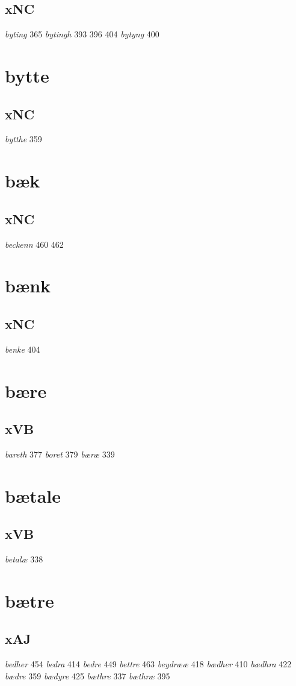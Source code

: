 \documentclass[a4paper,twocolumn]{article}
\begin{document}
\subsection{xNC}
\label{sec:org186402c}
\emph{byting} 365 \emph{bytingh} 393 396 404 \emph{bytyng} 400 
\section{bytte}
\label{sec:org489d211}
\subsection{xNC}
\label{sec:org4679dbe}
\emph{bytthe} 359 
\section{bæk}
\label{sec:org4123745}
\subsection{xNC}
\label{sec:org27db212}
\emph{beckenn} 460 462 
\section{bænk}
\label{sec:orgeed423f}
\subsection{xNC}
\label{sec:orgccb5224}
\emph{benke} 404 
\section{bære}
\label{sec:org1dee15a}
\subsection{xVB}
\label{sec:org9251b3a}
\emph{bareth} 377 \emph{boret} 379 \emph{bæræ} 339 
\section{bætale}
\label{sec:orgfa35092}
\subsection{xVB}
\label{sec:org2a6e371}
\emph{betalæ} 338 
\section{bætre}
\label{sec:orge25ecb2}
\subsection{xAJ}
\label{sec:orgac5863d}
\emph{bedher} 454 \emph{bedra} 414 \emph{bedre} 449 \emph{bettre} 463 \emph{beydrææ} 418 \emph{bædher} 410 \emph{bædhra} 422 \emph{bædre} 359 \emph{bædyre} 425 \emph{bæthre} 337 \emph{bæthræ} 395 
\end{document}
